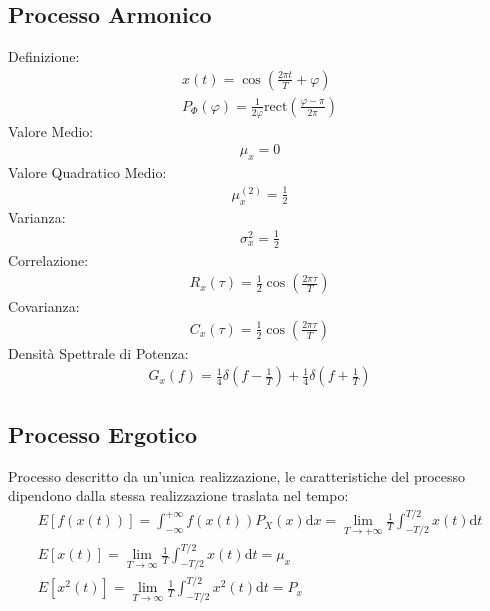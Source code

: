 \documentclass{article}
\newcommand{\rect}{\mathrm{rect}}
\newcommand{\df}{\mathrm{d}}
\newcommand{\intinf}{\displaystyle\int_{-\infty}^{+\infty}}
\newcommand{\intp}{\displaystyle\frac{1}{T}\int_{-T/2}^{T/2}}
\begin{document}
\subsection*{Processo Armonico}
Definizione:
\begin{gather*}
    x(t)=\cos\left(\displaystyle\frac{2\pi t}{T}+\varphi\right)\\
    P_{\Phi}(\varphi)=\displaystyle\frac{1}{2\varphi}\rect\left(\frac{\varphi-\pi}{2\pi}\right)
\end{gather*}
Valore Medio:
\begin{gather*}
    \mu_x=0
\end{gather*}
Valore Quadratico Medio:
\begin{gather*}
    \mu_x^{(2)}=\displaystyle\frac{1}{2}
\end{gather*}
Varianza:
\begin{gather*}
    \sigma_x^2=\displaystyle\frac{1}{2}
\end{gather*}
Correlazione:
\begin{gather*}
    R_x(\tau)=\displaystyle\frac{1}{2}\cos\left(\frac{2\pi\tau}{T}\right)
\end{gather*}
Covarianza:
\begin{gather*}
    C_x(\tau)=\displaystyle\frac{1}{2}\cos\left(\frac{2\pi\tau}{T}\right)
\end{gather*}
Densità Spettrale di Potenza:
\begin{gather*}
    G_x(f)=\displaystyle\frac{1}{4}\delta\left(f-\frac{1}{T}\right)+\frac{1}{4}\delta\left(f+\frac{1}{T}\right)
\end{gather*}
\subsection*{Processo Ergotico}
Processo descritto da un'unica realizzazione, le caratteristiche del processo dipendono dalla stessa realizzazione traslata nel tempo:
\begin{gather*}
    E[f(x(t))]=\intinf f(x(t))P_X(x)\df x=\lim_{T\to+\infty}\intp x(t)\df t\\
    E[x(t)]=\displaystyle\lim_{T\to\infty}\frac{1}{T}\int_{-T/2}^{T/2}x(t)\df t=\mu_x\\
    E[x^2(t)]=\displaystyle\lim_{T\to\infty}\frac{1}{T}\int_{-T/2}^{T/2}x^2(t)\df t=P_x
\end{gather*}
\end{document}
